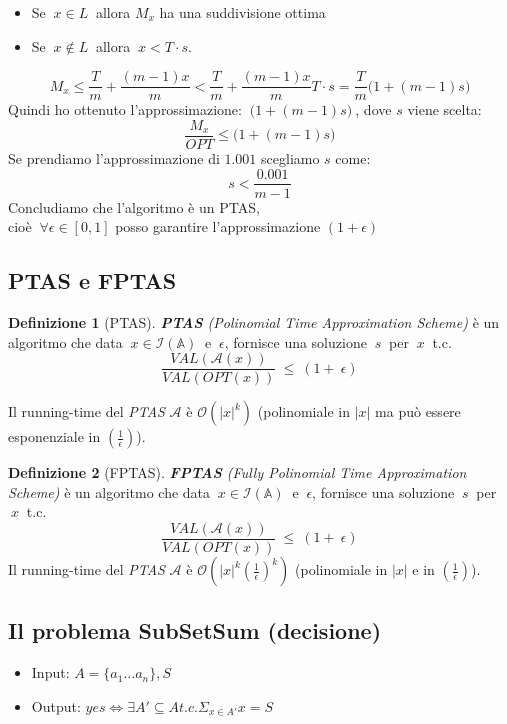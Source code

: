 \documentclass[a4paper]{article}
\theoremstyle{definition}
\newtheorem{definit}{Definizione}[subsection]
\begin{document}
		\begin{itemize}
			\item Se $ \ x \in L\ $ allora $ M_x $ ha una suddivisione ottima
			\item Se $ \ x \notin L\ $ allora $ \ x < T\cdot s $.
		\end{itemize}
		
		\[
			M_x \leq \dfrac{T}{m} + \dfrac{(m - 1)x}{m} < \dfrac{T}{m} + \dfrac{(m - 1)x}{m} T\cdot s =
			\dfrac{T}{m} \big( 1 + (m - 1) s \big)
		\]
		Quindi ho ottenuto l'approssimazione: $ \ \big( 1 + (m - 1) s \big)\ $, dove $ s $ viene scelta:
		\[
			\dfrac{M_x}{OPT} \leq \big( 1 + (m - 1) s \big)
		\]
		Se prendiamo l'approssimazione di $ 1.001 $ scegliamo $ s $ come:
		\[
			s < \dfrac{0.001}{m - 1}
		\]
		Concludiamo che l'algoritmo è un PTAS,\\ cioè $ \ \forall \epsilon \in \left[0, 1\right] $ posso garantire l'approssimazione $ (1 + \epsilon) $
		
		\subsection{PTAS e FPTAS}
		
		\begin{definit}[PTAS]
			\textit{\textbf{PTAS} (Polinomial Time Approximation Scheme)} è un algoritmo che data $\ x\in \mathcal{I}(\mathbb{A}) \ $ e $\ \epsilon$, fornisce una soluzione $\ s\ $ per $\ x\ $ t.c.
			\[
			\dfrac{VAL(\mathcal{A}(x))}{VAL(OPT(x))}~\leq~(1+~\epsilon)
			\]
			
			Il running-time del \textit{PTAS} $\mathcal{A}$ è $\mathcal{O}(|x|^k)$ (polinomiale in $|x|$ ma può essere esponenziale in $(\frac{1}{\epsilon})$).
		\end{definit}
		\begin{definit}[FPTAS]
			\textit{\textbf{FPTAS} (Fully Polinomial Time Approximation Scheme)} è un algoritmo che data $\ x\in \mathcal{I}(\mathbb{A})\ $ e $\ \epsilon$, fornisce una soluzione $\ s\ $ per $\ x\ $ t.c.
			\[
			\dfrac{VAL(\mathcal{A}(x))}{VAL(OPT(x))}~\leq~(1+~\epsilon)
			\]
			Il running-time del \textit{PTAS} $\mathcal{A}$ è $\mathcal{O}(|x|^k (\frac{1}{\epsilon})^k)$ (polinomiale in $|x|$ e in $(\frac{1}{\epsilon})$).
		\end{definit}
		
		\subsection{Il problema SubSetSum (decisione)}
		\begin{itemize}
			\item Input: $A = \{ a_1 \dots a_n \}, S$
			\item Output: $yes \Leftrightarrow \exists A' \subseteq A t.c. \Sigma_{x\in A'} x = S$
		\end{itemize}
		
\end{document}
